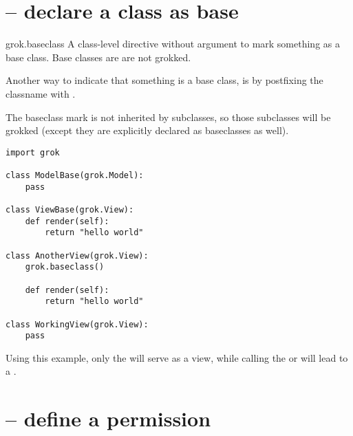     \section{ -- declare a class as base}

        \begin{funcdesc}{grok.baseclass}{}
          A class-level directive without argument to mark something
          as a base class. Base classes are are not grokked.

          Another way to indicate that something is a base class, is
          by postfixing the classname with .

          The baseclass mark is not inherited by subclasses, so those
          subclasses will be grokked (except they are explicitly
          declared as baseclasses as well).


          \begin{verbatim}
import grok

class ModelBase(grok.Model):
    pass

class ViewBase(grok.View):
    def render(self):
        return "hello world"

class AnotherView(grok.View):
    grok.baseclass()

    def render(self):
        return "hello world"

class WorkingView(grok.View):
    pass
          \end{verbatim}

          Using this example, only the  will serve
          as a view, while calling the  or
           will lead to a
          .


        \end{funcdesc}

    \section{ -- define a permission}

